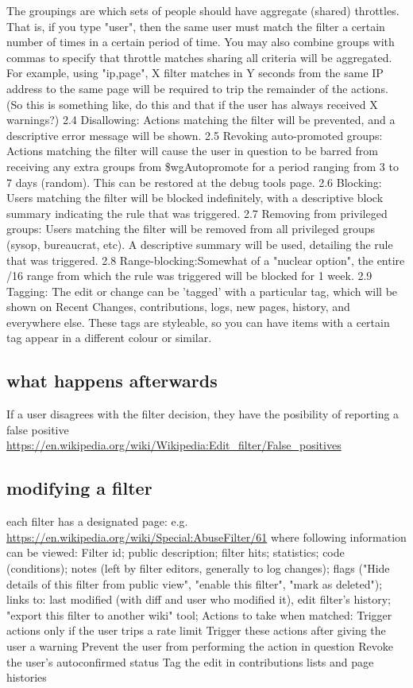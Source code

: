 \documentclass{sigchi}
\begin{document}
The groupings are which sets of people should have aggregate (shared) throttles. That is, if you type "user", then the same user must match the filter a certain number of times in a certain period of time. You may also combine groups with commas to specify that throttle matches sharing all criteria will be aggregated. For example, using "ip,page", X filter matches in Y seconds from the same IP address to the same page will be required to trip the remainder of the actions.
(So this is something like, do this and that if the user has always received X warnings?)
    2.4 Disallowing: Actions matching the filter will be prevented, and a descriptive error message will be shown.
    2.5 Revoking auto-promoted groups: Actions matching the filter will cause the user in question to be barred from receiving any extra groups from \$wgAutopromote for a period ranging from 3 to 7 days (random). This can be restored at the debug tools page.
    2.6 Blocking: Users matching the filter will be blocked indefinitely, with a descriptive block summary indicating the rule that was triggered.
    2.7 Removing from privileged groups: Users matching the filter will be removed from all privileged groups (sysop, bureaucrat, etc). A descriptive summary will be used, detailing the rule that was triggered.
    2.8 Range-blocking:Somewhat of a "nuclear option", the entire /16 range from which the rule was triggered will be blocked for 1 week.
    2.9 Tagging: The edit or change can be 'tagged' with a particular tag, which will be shown on Recent Changes, contributions, logs, new pages, history, and everywhere else. These tags are styleable, so you can have items with a certain tag appear in a different colour or similar.


\subsection{what happens afterwards}

If a user disagrees with the filter decision, they have the posibility of reporting a false positive
\url{https://en.wikipedia.org/wiki/Wikipedia:Edit_filter/False_positives}

\subsection{modifying a filter}

each filter has a designated page: e.g. \url{https://en.wikipedia.org/wiki/Special:AbuseFilter/61}
where following information can be viewed:
Filter id; public description; filter hits; statistics; code (conditions); notes (left by filter editors, generally to log changes); flags ("Hide details of this filter from public view", "enable this filter", "mark as deleted");
links to: last modified (with diff and user who modified it), edit filter's history; "export this filter to another wiki" tool;
Actions to take when matched:
Trigger actions only if the user trips a rate limit
Trigger these actions after giving the user a warning
Prevent the user from performing the action in question
Revoke the user's autoconfirmed status
Tag the edit in contributions lists and page histories
\end{document}

